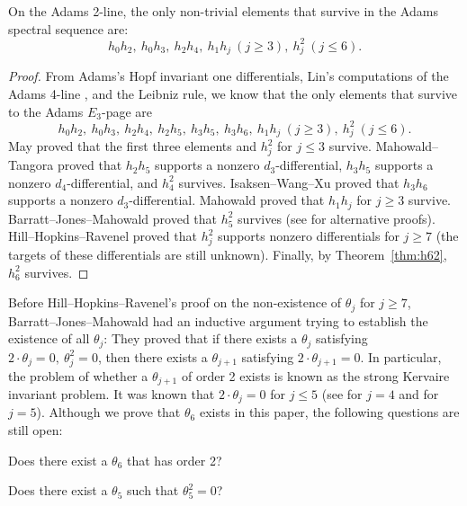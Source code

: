 \documentclass{amsart}
\numberwithin{equation}{section}
\begin{document}
\begin{corollary} \label{cor:2line}
    On the Adams 2-line, the only non-trivial elements that survive in the Adams spectral sequence are:
    $$h_0h_2, \ h_0h_3, \ h_2h_4, \ h_1h_j \ (j \geq 3), \ h_j^2 \ (j \leq 6).$$
\end{corollary}

\begin{proof}
    From Adams's Hopf invariant one differentials, Lin's computations of the Adams 4-line \cite{LinExt4}, and the Leibniz rule, we know that the only elements that survive to the Adams $E_3$-page are
    $$h_0h_2, \ h_0h_3, \ h_2h_4, \ h_2h_5, \ h_3h_5, \ h_3h_6, \ h_1h_j \ (j \geq 3), \ h_j^2 \ (j \leq 6).$$
May \cite{Maythesis} proved that the first three elements and $h_j^2$ for $j \leq 3$ survive. Mahowald--Tangora \cite{MahowaldTangora} proved that $h_2h_5$ supports a nonzero $d_3$-differential, $h_3h_5$ supports a nonzero $d_4$-differential, and $h_4^2$ survives. Isaksen--Wang--Xu \cite{IWX} proved that $h_3h_6$ supports a nonzero $d_3$-differential. Mahowald \cite{Mahowaldetaj} proved that $h_1h_j$ for $j \geq 3$ survive. Barratt--Jones--Mahowald \cite{BJMtheta5} proved that $h_5^2$ survives (see \cite{Xu, IWX} for alternative proofs). Hill--Hopkins--Ravenel \cite{HHR} proved that $h_j^2$ supports nonzero differentials for $j \geq 7$ (the targets of these differentials are still unknown). Finally, by Theorem~\ref{thm:h62}, $h_6^2$ survives.   
\end{proof}

Before Hill--Hopkins--Ravenel's proof on the non-existence of $\theta_j$ for $j \geq 7$, Barratt--Jones--Mahowald \cite{BJMinduction} had an inductive argument trying to establish the existence of all $\theta_j$: They proved that if there exists a $\theta_j$ satisfying $2\cdot \theta_j = 0, \ \theta_j^2 = 0$, then there exists a $\theta_{j+1}$ satisfying $2\cdot \theta_{j+1} = 0$. In particular, the problem of whether a $\theta_{j+1}$ of order 2 exists is known as the strong Kervaire invariant problem. It was known that $2\cdot \theta_j = 0$ for $j \leq 5$ (see \cite{MahowaldTangora} for $j=4$ and \cite{Xu, IWX} for $j=5$). Although we prove that $\theta_6$ exists in this paper, the following questions are still open:

\begin{question} \label{que:2theta6}
    Does there exist a $\theta_6$ that has order 2?
\end{question}

\begin{question} \label{que:theta5sq}
    Does there exist a $\theta_5$ such that $\theta_5^2 = 0$?
\end{question}
\end{document}
